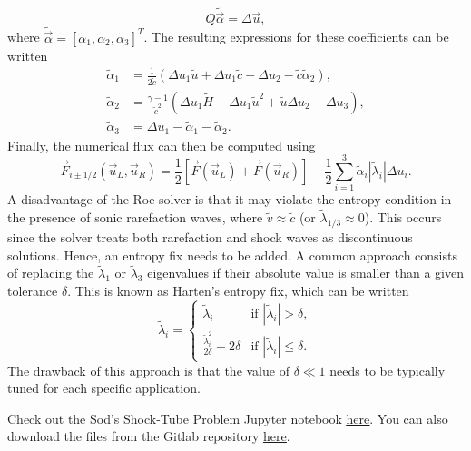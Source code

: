 \begin{equation}
	Q\tilde{\vec \alpha} = \Delta \vec u,
\end{equation}
where $\tilde{\vec \alpha}=[\tilde\alpha_1,\tilde\alpha_2,\tilde\alpha_3]^T$. The resulting expressions for these coefficients can be written
\begin{align}
	\tilde \alpha_1 &= \frac{1}{2\tilde c}\left(\Delta u_1 \tilde u + \Delta u_1\tilde c - \Delta u_2 - \tilde c \tilde \alpha_2\right),\\ 
	\tilde \alpha_2 &= \frac{\gamma-1}{\tilde c^2} \left(\Delta u_1 \tilde H - \Delta u_1 \tilde u^2 + \tilde u \Delta u_2 - \Delta u_3 \right),\\
	\tilde \alpha_3 &= \Delta u_1 - \tilde\alpha_1 - \tilde\alpha_2.
\end{align}
Finally, the numerical flux can then be computed using
\begin{equation}
	\vec F_{i\pm1/2}(\vec u_L, \vec u_R) = \frac{1}{2} \left[\vec F(\vec u_L) + \vec F(\vec u_R)\right] - \frac{1}{2} \sum_{i=1}^3 \tilde \alpha_i |\tilde \lambda_i| \Delta u_i.
\end{equation}
A disadvantage of the Roe solver is that it may violate the entropy condition in the presence of sonic rarefaction waves, where $\tilde v\approx \tilde c$ (or $\tilde \lambda_{1/3}\approx 0$). This occurs since the solver treats both rarefaction and shock waves as discontinuous solutions. Hence, an entropy fix needs to be added. A common approach consists of replacing the $\tilde\lambda_1$ or $\tilde\lambda_3$ eigenvalues if their absolute value is smaller than a given tolerance $\delta$. This is known as Harten's entropy fix, which can be written~\cite{levequeFiniteVolumeMethods2002}
\begin{equation}
	\tilde\lambda_i = 
	\begin{cases}
		\tilde\lambda_i &\text{if } |\tilde \lambda_i| > \delta, \\
		\frac{\tilde\lambda_i^2}{2\delta} + 2\delta &\text{if } |\tilde \lambda_i| \leq \delta.
	\end{cases}
\end{equation}
The drawback of this approach is that the value of $\delta\ll1$ needs to be typically tuned for each specific application.
\begin{jupyternote}
	Check out the Sod's Shock-Tube Problem Jupyter notebook \href{\binderurl}{\underline{here}}. You can also download the files from the Gitlab repository \href{\repourl}{\underline{here}}.
\end{jupyternote}
